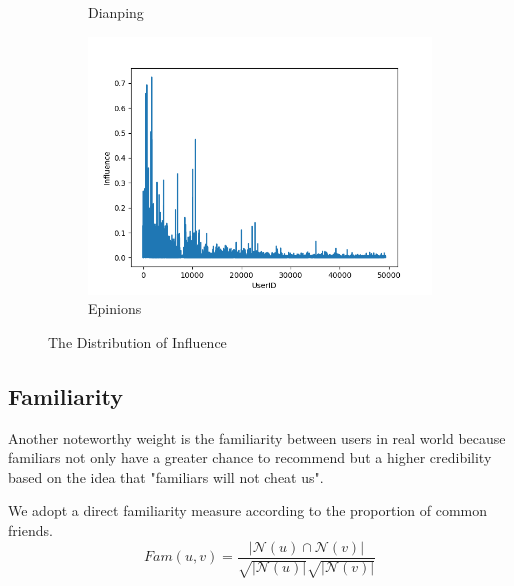 \documentclass{article}
\begin{document}
\begin{figure}[h]
\begin{subfigure}{0.33\textwidth}
      \caption{Dianping}
    \end{subfigure}%
    \begin{subfigure}{0.33\textwidth}
      \centering
        \includegraphics[width=1\linewidth]{pic/figure3_3.png}
        \caption{Epinions}
    \end{subfigure}
  \caption{The Distribution of Influence}
\end{figure}
\subsection{Familiarity}
Another noteworthy weight is the familiarity between users in real world
because familiars not only have a greater chance to recommend but a higher credibility 
based on the idea that "familiars will not cheat us". 

We adopt a direct familiarity measure \cite{liang2012pr} according to the proportion of common friends.
\begin{equation}
  {Fam}(u, v) = \frac{|\mathcal{N}(u) \cap \mathcal{N}(v)|}{\sqrt{|\mathcal{N}(u)|} \sqrt{|\mathcal{N}(v)|}}
\end{equation}
\end{document}
